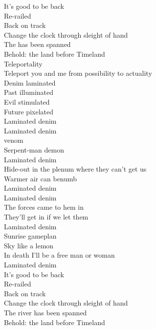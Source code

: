 




It's good to be back\\
Re-railed\\
Back on track\\
Change the clock through sleight of hand\\
The  has been spanned\\
Behold: the land before Timeland\\

Teleportality\\
Teleport you and me from possibility to actuality\\
Denim laminated\\
Past illuminated\\
Evil stimulated\\
Future pixelated\\

Laminated denim\\

Laminated denim\\
 venom\\
Serpent-man demon\\
Laminated denim\\
Hide-out in the plenum where they can't get us\\
Warmer air can benumb\\
Laminated denim\\

Laminated denim\\
The forces came to hem in\\
They'll get in if we let them\\
Laminated denim\\
Sunrise gameplan\\
Sky like a lemon\\
In death I'll be a free man or woman\\
Laminated denim\\

It's good to be back\\
Re-railed\\
Back on track\\
Change the clock through sleight of hand\\
The river has been spanned\\
Behold: the land before Timeland\\

